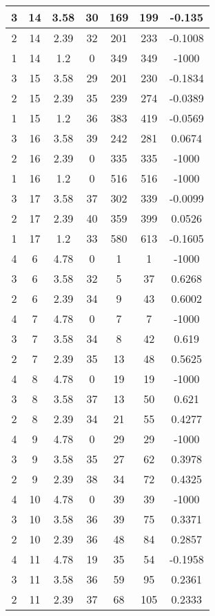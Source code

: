 \documentclass[letterpaper, 12pt]{article}
\begin{document}
\begin{longtable}{|c|c|c|c|c|c|c|}
\hline
3 & 14 & 3.58 & 30 & 169 & 199 & -0.135 \\
\hline
2 & 14 & 2.39 & 32 & 201 & 233 & -0.1008 \\
\hline
1 & 14 & 1.2 & 0 & 349 & 349 & -1000 \\
\hline
3 & 15 & 3.58 & 29 & 201 & 230 & -0.1834 \\
\hline
2 & 15 & 2.39 & 35 & 239 & 274 & -0.0389 \\
\hline
1 & 15 & 1.2 & 36 & 383 & 419 & -0.0569 \\
\hline
3 & 16 & 3.58 & 39 & 242 & 281 & 0.0674 \\
\hline
2 & 16 & 2.39 & 0 & 335 & 335 & -1000 \\
\hline
1 & 16 & 1.2 & 0 & 516 & 516 & -1000 \\
\hline
3 & 17 & 3.58 & 37 & 302 & 339 & -0.0099 \\
\hline
2 & 17 & 2.39 & 40 & 359 & 399 & 0.0526 \\
\hline
1 & 17 & 1.2 & 33 & 580 & 613 & -0.1605 \\
\hline
4 & 6 & 4.78 & 0 & 1 & 1 & -1000 \\
\hline
3 & 6 & 3.58 & 32 & 5 & 37 & 0.6268 \\
\hline
2 & 6 & 2.39 & 34 & 9 & 43 & 0.6002 \\
\hline
4 & 7 & 4.78 & 0 & 7 & 7 & -1000 \\
\hline
3 & 7 & 3.58 & 34 & 8 & 42 & 0.619 \\
\hline
2 & 7 & 2.39 & 35 & 13 & 48 & 0.5625 \\
\hline
4 & 8 & 4.78 & 0 & 19 & 19 & -1000 \\
\hline
3 & 8 & 3.58 & 37 & 13 & 50 & 0.621 \\
\hline
2 & 8 & 2.39 & 34 & 21 & 55 & 0.4277 \\
\hline
4 & 9 & 4.78 & 0 & 29 & 29 & -1000 \\
\hline
3 & 9 & 3.58 & 35 & 27 & 62 & 0.3978 \\
\hline
2 & 9 & 2.39 & 38 & 34 & 72 & 0.4325 \\
\hline
4 & 10 & 4.78 & 0 & 39 & 39 & -1000 \\
\hline
3 & 10 & 3.58 & 36 & 39 & 75 & 0.3371 \\
\hline
2 & 10 & 2.39 & 36 & 48 & 84 & 0.2857 \\
\hline
4 & 11 & 4.78 & 19 & 35 & 54 & -0.1958 \\
\hline
3 & 11 & 3.58 & 36 & 59 & 95 & 0.2361 \\
\hline
2 & 11 & 2.39 & 37 & 68 & 105 & 0.2333 \\

\end{longtable}
\end{document}
